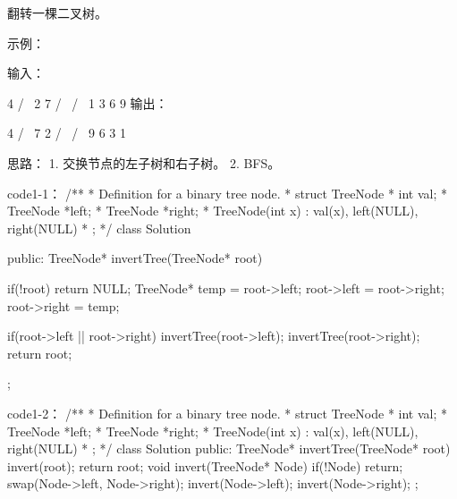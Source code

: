 翻转一棵二叉树。

示例：

输入：

     4
   /   \
  2     7
 / \   / \
1   3 6   9
输出：

     4
   /   \
  7     2
 / \   / \
9   6 3   1

















思路：
1. 交换节点的左子树和右子树。
2. BFS。


















code1-1：
/**
 * Definition for a binary tree node.
 * struct TreeNode {
 *     int val;
 *     TreeNode *left;
 *     TreeNode *right;
 *     TreeNode(int x) : val(x), left(NULL), right(NULL) {}
 * };
 */
class Solution {
public:
    TreeNode* invertTree(TreeNode* root) {
        if(!root) return NULL;
        TreeNode* temp = root->left;
        root->left = root->right;
        root->right = temp;
        
        if(root->left || root->right)
        {
            invertTree(root->left);
            invertTree(root->right);
        }
        return root;
    }
};



















code1-2：
/**
 * Definition for a binary tree node.
 * struct TreeNode {
 *     int val;
 *     TreeNode *left;
 *     TreeNode *right;
 *     TreeNode(int x) : val(x), left(NULL), right(NULL) {}
 * };
 */
class Solution {
public:
    TreeNode* invertTree(TreeNode* root) {
        invert(root);
        return root;
    }
    void invert(TreeNode* Node)
    {
        if(!Node) return;
        swap(Node->left, Node->right);
        invert(Node->left);
        invert(Node->right);
    }
};























